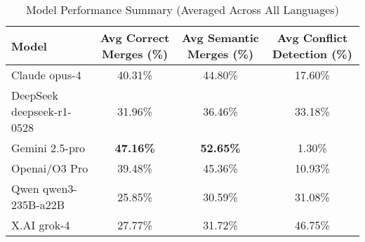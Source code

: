 \begin{table}[htbp]
\centering
\caption{Model Performance Summary (Averaged Across All Languages)}
\label{tab:model_performance_summary}
\begin{tabular}{|l|c|c|c|}
\hline
\textbf{Model} & \textbf{Avg Correct Merges (\%)} & \textbf{Avg Semantic Merges (\%)} & \textbf{Avg Conflict Detection (\%)} \\
\hline
Claude opus-4 & 40.31\% & 44.80\% & 17.60\% \\
DeepSeek deepseek-r1-0528 & 31.96\% & 36.46\% & 33.18\% \\
Gemini 2.5-pro & \textbf{47.16\%} & \textbf{52.65\%} & 1.30\% \\
Openai/O3 Pro & 39.48\% & 45.36\% & 10.93\% \\
Qwen qwen3-235B-a22B & 25.85\% & 30.59\% & 31.08\% \\
X.AI grok-4 & 27.77\% & 31.72\% & 46.75\% \\
\hline
\end{tabular}
\end{table}
